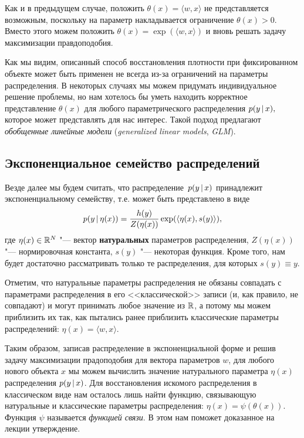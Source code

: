 \documentclass[12pt,a4paper]{article}
\begin{document}
\begin{enumerate}
        Как и в предыдущем случае, положить $\theta(x) = \langle w, x \rangle$ не представляется возможным, поскольку на параметр накладывается ограничение $\theta(x) > 0$. Вместо этого можем положить $\theta(x) = \exp(\langle w, x \rangle)$ и вновь решать задачу максимизации правдоподобия.
    \end{enumerate}
     
     Как мы видим, описанный способ восстановления плотности при фиксированном объекте может быть применен не всегда из-за ограничений на параметры распределения. В некоторых случаях мы можем придумать индивидуальное решение проблемы, но нам хотелось бы уметь находить корректное представление $\theta(x)$ для любого параметрического распределения $p(y \mspace{3mu}{|}\mspace{3mu} x),$ которое может представлять для нас интерес. Такой подход предлагают \emph{обобщенные линейные модели} (\emph{generalized linear models}, \emph{GLM}).
     
     \subsection{Экспоненциальное семейство распределений}
     \par Везде далее мы будем считать, что распределение~$p(y \mspace{3mu}{|}\mspace{3mu} x)$ принадлежит экспоненциальному семейству, т.е. может быть представлено в виде 
     \begin{equation*}
         p(y \mspace{3mu}{|}\mspace{3mu} \eta(x)) = \frac{h(y)}{Z(\eta(x))} \exp(\langle \eta(x), s(y)\rangle),
     \end{equation*}
     где $\eta(x) \in \mathbb{R}^N$ "--- вектор \textbf{натуральных} параметров распределения, $Z(\eta(x))$ "--- нормировочная константа, $s(y)$ "--- некоторая функция. Кроме того, нам будет достаточно рассматривать только те распределения, для которых $s(y) \equiv y$.
     \par Отметим, что натуральные параметры распределения не обязаны совпадать с параметрами распределения в его <<классической>> записи (и, как правило, не совпадают) и могут принимать любое значение из $\mathbb{R}$, а потому мы можем приблизить их так, как пытались ранее приблизить классические параметры распределений: $\eta(x) = \langle w, x \rangle.$
     \par Таким образом, записав распределение в экспоненциальной форме и решив задачу максимизации прадоподобия для вектора параметров $w$, для любого нового объекта $x$ мы можем вычислить значение натурального параметра $\eta(x)$ распределения $p(y \mspace{3mu}{|}\mspace{3mu} x)$. Для восстановления искомого распределения в классическом виде нам осталось лишь найти функцию, связывающую натуральные и классические параметры распределения: $\eta(x) = \psi (\theta(x))$. Функция $\psi$ называется \emph{функцией связи}. В этом нам поможет доказанное на лекции утверждение.
\end{document}
